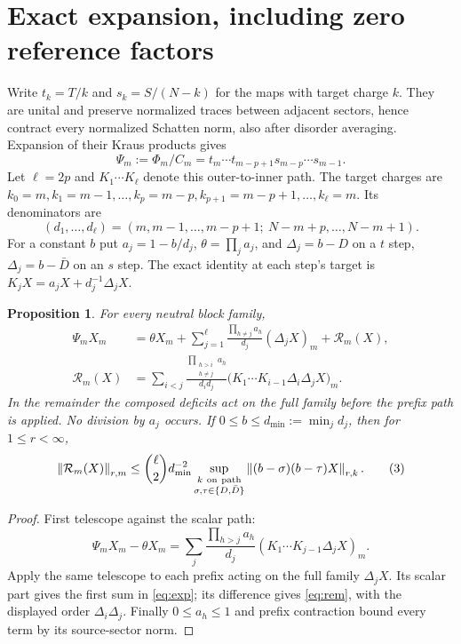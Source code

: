 \documentclass[11pt]{article}
\newcommand{\norm}[1]{\left\lVert#1\right\rVert}
\newtheorem{proposition}{Proposition}
\begin{document}
\section{Exact expansion, including zero reference factors}
Write $t_k=T/k$ and $s_k=S/(N-k)$ for the maps with target charge $k$.
They are unital and preserve normalized traces between adjacent sectors,
hence contract every normalized Schatten norm, also after disorder
averaging. Expansion of their Kraus products gives \cite{operator}
\[
 \Psi_m:=\Phi_m/C_m=t_m\cdots t_{m-p+1}s_{m-p}\cdots s_{m-1}.
\]
Let $\ell=2p$ and $K_1\cdots K_\ell$ denote this outer-to-inner path.
The target charges are $k_0=m,k_1=m-1,\ldots,k_p=m-p,
k_{p+1}=m-p+1,\ldots,k_\ell=m$. Its denominators are
\[
 (d_1,\ldots,d_\ell)
 =(m,m-1,\ldots,m-p+1;\ N-m+p,\ldots,N-m+1).
\]
For a constant $b$ put $a_j=1-b/d_j$, $\theta=\prod_ja_j$,
and $\Delta_j=b-D$ on a $t$ step, $\Delta_j=b-\bar D$ on an $s$
step. The exact identity at each step's target is
$K_jX=a_jX+d_j^{-1}\Delta_jX$.
\begin{proposition}
For every neutral block family,
\begin{align}
 \Psi_mX_m&=\theta X_m+
 \sum_{j=1}^{\ell}\frac{\prod_{h\ne j}a_h}{d_j}(\Delta_jX)_m
 +\mathcal R_m(X), \label{eq:exp}\\
 \mathcal R_m(X)&=\sum_{i<j}
 \frac{\prod_{\substack{h>i\\h\ne j}}a_h}{d_id_j}
 \bigl(K_1\cdots K_{i-1}\Delta_i\Delta_jX\bigr)_m .
 \label{eq:rem}
\end{align}
In the remainder the composed deficits act on the full family before
the prefix path is applied. No division by $a_j$ occurs.
If $0\le b\le d_{\min}:=\min_jd_j$, then for $1\le r<\infty$,
\[
 \norm{\mathcal R_m(X)}_{r,m}
 \le \binom{\ell}{2}d_{\min}^{-2}
 \sup_{\substack{k\ {\rm on\ path}\\
             \sigma,\tau\in\{D,\bar D\}}}
 \norm{(b-\sigma)(b-\tau)X}_{r,k}.
 \label{eq:bound}\tag{3}
\]
\end{proposition}
\begin{proof}
First telescope against the scalar path:
\[
 \Psi_mX_m-\theta X_m
 =\sum_j\frac{\prod_{h>j}a_h}{d_j}
       (K_1\cdots K_{j-1}\Delta_jX)_m .
\]
Apply the same telescope to each prefix acting on the full family
$\Delta_jX$. Its scalar part gives the first sum in
\eqref{eq:exp}; its difference gives \eqref{eq:rem}, with the displayed
order $\Delta_i\Delta_j$. Finally $0\le a_h\le1$ and prefix
contraction bound every term by its source-sector norm.
\end{proof}
\newpage
\end{document}
